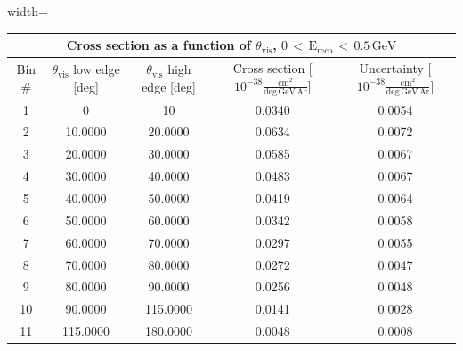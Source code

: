 \begin{table}[H]
\raggedright
\begin{adjustbox}{width=\textwidth}
\small
\begin{tabular}{ |c|c|c|c|c| }
\hline
\multicolumn{5}{|c|}{Cross section as a function of $\theta_{\mathrm{vis}}$, $\mathrm{0\,<\,E_{re\textit{c}o}\,<\,0.5\,GeV}$} \\
\hline
\hline
Bin \# & $\theta_{\mathrm{vis}}$ low edge [deg] & $\theta_{\mathrm{vis}}$ high edge [deg] & Cross section [$10^{-38}\mathrm{\frac{cm^{2}}{deg\,GeV\,Ar}}$] & Uncertainty [$10^{-38}\mathrm{\frac{cm^{2}}{deg\,GeV\,Ar}}$] \\
\hline
\hline
1 & 0 & 10 & 0.0340 & 0.0054\\
2 & 10.0000 & 20.0000 & 0.0634 & 0.0072\\
3 & 20.0000 & 30.0000 & 0.0585 & 0.0067\\
4 & 30.0000 & 40.0000 & 0.0483 & 0.0067\\
5 & 40.0000 & 50.0000 & 0.0419 & 0.0064\\
6 & 50.0000 & 60.0000 & 0.0342 & 0.0058\\
7 & 60.0000 & 70.0000 & 0.0297 & 0.0055\\
8 & 70.0000 & 80.0000 & 0.0272 & 0.0047\\
9 & 80.0000 & 90.0000 & 0.0256 & 0.0048\\
10 & 90.0000 & 115.0000 & 0.0141 & 0.0028\\
11 & 115.0000 & 180.0000 & 0.0048 & 0.0008\\
\hline
\end{tabular}
\end{adjustbox}
\end{table}


